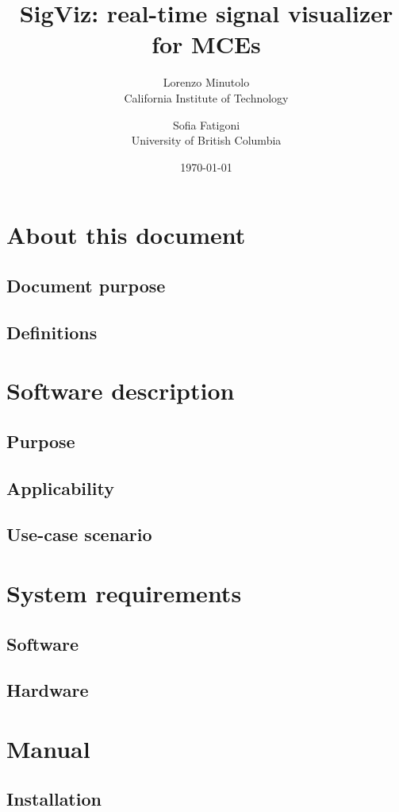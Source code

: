 \documentclass{article}
\title{SigViz: real-time signal visualizer for MCEs}
\author{Lorenzo Minutolo  \\
	California Institute of Technology  \\
	\and
	Sofia Fatigoni \\
	University of British Columbia \\
	}
\date{\today}
\begin{document}
\maketitle

\tableofcontents
\newpage

\section{About this document}\label{about}
\subsection{Document purpose}
\subsection{Definitions}

\section{Software description}\label{description}
\subsection{Purpose}
\subsection{Applicability}
\subsection{Use-case scenario}

\section{System requirements} \label{requirements}
\subsection{Software}
\subsection{Hardware}

\section{Manual}
\subsection{Installation}
\end{document}
